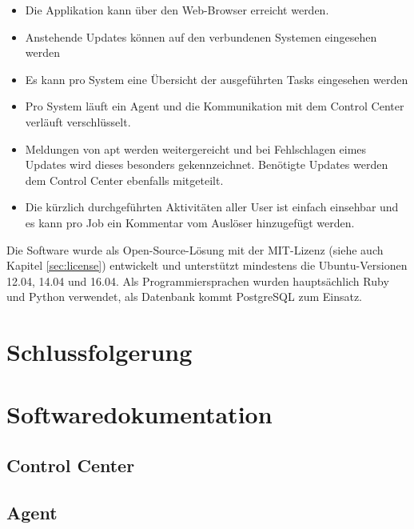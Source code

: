 \begin{itemize}
    \item Die Applikation kann über den Web-Browser erreicht werden.
    \item Anstehende Updates können auf den verbundenen Systemen eingesehen werden
    \item Es kann pro System eine Übersicht der ausgeführten Tasks eingesehen werden
    \item Pro System läuft ein Agent und die Kommunikation mit dem Control Center verläuft verschlüsselt.
    \item Meldungen von {apt} werden weitergereicht und bei Fehlschlagen eimes Updates wird dieses besonders gekennzeichnet. Benötigte Updates werden dem Control Center ebenfalls mitgeteilt.
    \item Die kürzlich durchgeführten Aktivitäten aller User ist einfach einsehbar und es kann pro Job ein Kommentar vom Auslöser hinzugefügt werden.
\end{itemize}


Die Software wurde als Open-Source-Lösung mit der MIT-Lizenz (siehe auch Kapitel \ref{sec:license}) entwickelt und unterstützt mindestens die Ubuntu-Versionen 12.04, 14.04 und 16.04. Als Programmiersprachen wurden hauptsächlich Ruby und Python verwendet, als Datenbank kommt PostgreSQL zum Einsatz.

\section{Schlussfolgerung}
\label{conclusion}


\xxx

\section{Softwaredokumentation}
\label{documentation}


\subsection*{Control Center}



\subsection*{Agent}
